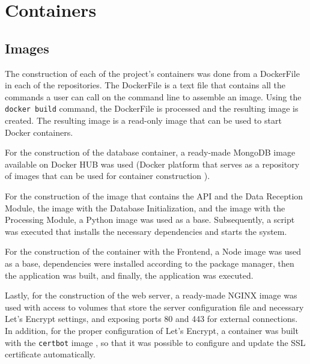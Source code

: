 \section{Containers}\label{sec:containersimpl}

\subsection{Images}\label{subsec:containersimagesDefinition}
The construction of each of the project's containers was done from a DockerFile in each of the repositories. The DockerFile is a text file that contains all the commands a user can call on the command line to assemble an image. Using the \texttt{docker build} command, the DockerFile is processed and the resulting image is created. The resulting image is a read-only image that can be used to start Docker containers.

For the construction of the database container, a ready-made MongoDB image available on Docker HUB \cite{dockerMongo} was used (Docker platform that serves as a repository of images that can be used for container construction \cite{dockerHub}).

For the construction of the image that contains the API and the Data Reception Module, the image with the Database Initialization, and the image with the Processing Module, a Python image \cite{dockerPython} was used as a base. Subsequently, a script was executed that installs the necessary dependencies and starts the system. %

For the construction of the container with the Frontend, a Node image \cite{dockerNode} was used as a base, dependencies were installed according to the package manager, then the application was built, and finally, the application was executed. %

Lastly, for the construction of the web server, a ready-made NGINX image \cite{dockerNginx} was used with access to volumes that store the server configuration file and necessary Let's Encrypt settings, and exposing ports 80 and 443 for external connections. In addition, for the proper configuration of Let's Encrypt, a container was built with the \texttt{certbot} image \cite{dockerCertbot}, so that it was possible to configure and update the SSL certificate automatically.

